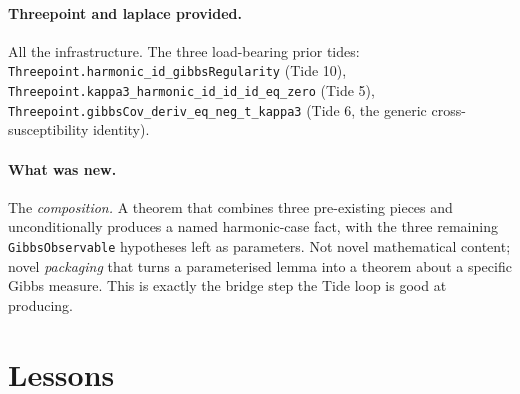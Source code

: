 \documentclass[11pt]{article}
\begin{document}
\paragraph{Threepoint and laplace provided.} All the infrastructure.
The three load-bearing prior tides:
\texttt{Threepoint.harmonic\_id\_gibbsRegularity} (Tide 10),
\texttt{Threepoint.kappa3\_harmonic\_id\_id\_id\_eq\_zero} (Tide 5),
\texttt{Threepoint.gibbsCov\_deriv\_eq\_neg\_t\_kappa3}
(Tide 6, the generic cross-susceptibility identity).

\paragraph{What was new.} The \emph{composition.} A theorem that
combines three pre-existing pieces and unconditionally produces a
named harmonic-case fact, with the three remaining
\texttt{GibbsObservable} hypotheses left as parameters. Not novel
mathematical content; novel \emph{packaging} that turns a
parameterised lemma into a theorem about a specific Gibbs measure.
This is exactly the bridge step the Tide loop is good at producing.

\section{Lessons}
\end{document}
